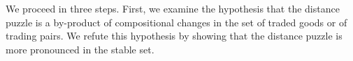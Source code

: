 \documentclass[12pt,twoside,a4paper,notitlepage]{article}
\begin{document}
We proceed in three steps.
First, we examine the hypothesis that the distance puzzle is a by-product of compositional changes in the set of traded goods or of trading pairs.
We refute this hypothesis by showing that the distance puzzle is more pronounced in the stable set.
\end{document}
